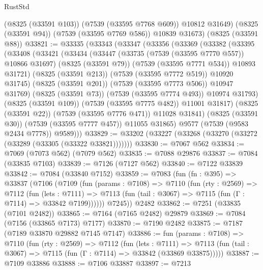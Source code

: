 \begin{lexlean}{RustStd}
\begin{coremodule}
        (@8325 (@33591 @103))
        (@7539 (@33595 @7768 @609))
        @10812
        @31649)
      (@8325 (@33591 @94))
      (@7539 (@33595 @7769 @586))
      @10839
      @31673)
    (@8325 (@33591 @88))
@33821 := @33335
    (@33343
      (@33347
        (@33356
          (@33369
            (@33382
              (@33395
                (@33408
                  (@33421
                    (@33434
                      (@33447
                        (@33735 (@7539 (@33595 @7770 @557)) @10866 @31697)
                        (@8325 (@33591 @79))
                        (@7539 (@33595 @7771 @534))
                        @10893
                        @31721)
                      (@8325 (@33591 @213))
                      (@7539 (@33595 @7772 @519))
                      @10920
                      @31745)
                    (@8325 (@33591 @201))
                    (@7539 (@33595 @7773 @506))
                    @10947
                    @31769)
                  (@8325 (@33591 @73))
                  (@7539 (@33595 @7774 @493))
                  @10974
                  @31793)
                (@8325 (@33591 @109))
                (@7539 (@33595 @7775 @482))
                @11001
                @31817)
              (@8325 (@33591 @22))
              (@7539 (@33595 @7776 @471))
              @11028
              @31841)
            (@8325 (@33591 @30))
            (@7539 (@33595 @7777 @457))
            @11055
            @31865)
          @9577
          (@7539 (@9583 @2434 @7778))
          @9589)))
@33829 := @33202 (@33227 (@33268 (@33270 (@33272 (@33289 (@33305 (@33322 @33821)))))))
@33830 := @7067 @562
@33834 := @7069 (@7073 @562) (@7079 @562)
@33835 := @7088 @29876
@33837 := @7084 (@33835 @7103)
@33839 := @7126 (@7127 @562)
@33840 := @7122 @33839
@33842 := @7084 (@33840 @7152)
@33859 := @7083
    (fun (fn : @395) =>
    @33837
      (@7106
        (@7109
          (fun (params : @7108) =>
          @7110
            (fun (rty : @2569) =>
            @7112
              (fun (lets : @7111) =>
              @7113 (fun (tail : @3067) => @7115 (fun (Γ : @7114) => @33842 @7199))))))
        @7245))
    @2482
@33862 := @7251 (@33835 (@7101 @2482))
@33865 := @7164 (@7165 @2482) @29879
@33869 := @7084 (@7156 (@33865 @7173) @7177)
@33870 := @7190 @2482
@33875 := @7187 (@7189 @33870 @29882 @7145 @7147)
@33886 := fun (params : @7108) =>
  @7110
    (fun (rty : @2569) =>
    @7112
      (fun (lets : @7111) =>
      @7113 (fun (tail : @3067) => @7115 (fun (Γ : @7114) => @33842 (@33869 @33875)))))
@33887 := @7109 @33886
@33888 := @7106 @33887
@33897 := @7213

\end{coremodule}
\end{lexlean}
